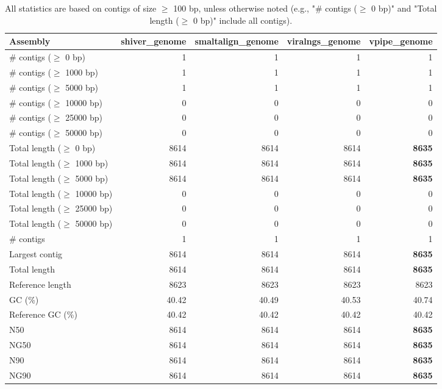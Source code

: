 \documentclass[12pt,a4paper]{article}
\begin{document}
\begin{table}[ht]
\begin{center}
\caption{All statistics are based on contigs of size $\geq$ 100 bp, unless otherwise noted (e.g., "\# contigs ($\geq$ 0 bp)" and "Total length ($\geq$ 0 bp)" include all contigs).}
\begin{tabular}{|l*{4}{|r}|}
\hline
Assembly & shiver\_genome & smaltalign\_genome & viralngs\_genome & vpipe\_genome \\ \hline
\# contigs ($\geq$ 0 bp) & 1 & 1 & 1 & 1 \\ \hline
\# contigs ($\geq$ 1000 bp) & 1 & 1 & 1 & 1 \\ \hline
\# contigs ($\geq$ 5000 bp) & 1 & 1 & 1 & 1 \\ \hline
\# contigs ($\geq$ 10000 bp) & 0 & 0 & 0 & 0 \\ \hline
\# contigs ($\geq$ 25000 bp) & 0 & 0 & 0 & 0 \\ \hline
\# contigs ($\geq$ 50000 bp) & 0 & 0 & 0 & 0 \\ \hline
Total length ($\geq$ 0 bp) & 8614 & 8614 & 8614 & {\bf 8635} \\ \hline
Total length ($\geq$ 1000 bp) & 8614 & 8614 & 8614 & {\bf 8635} \\ \hline
Total length ($\geq$ 5000 bp) & 8614 & 8614 & 8614 & {\bf 8635} \\ \hline
Total length ($\geq$ 10000 bp) & 0 & 0 & 0 & 0 \\ \hline
Total length ($\geq$ 25000 bp) & 0 & 0 & 0 & 0 \\ \hline
Total length ($\geq$ 50000 bp) & 0 & 0 & 0 & 0 \\ \hline
\# contigs & 1 & 1 & 1 & 1 \\ \hline
Largest contig & 8614 & 8614 & 8614 & {\bf 8635} \\ \hline
Total length & 8614 & 8614 & 8614 & {\bf 8635} \\ \hline
Reference length & 8623 & 8623 & 8623 & 8623 \\ \hline
GC (\%) & 40.42 & 40.49 & 40.53 & 40.74 \\ \hline
Reference GC (\%) & 40.42 & 40.42 & 40.42 & 40.42 \\ \hline
N50 & 8614 & 8614 & 8614 & {\bf 8635} \\ \hline
NG50 & 8614 & 8614 & 8614 & {\bf 8635} \\ \hline
N90 & 8614 & 8614 & 8614 & {\bf 8635} \\ \hline
NG90 & 8614 & 8614 & 8614 & {\bf 8635} \\ \hline

\end{tabular}
\end{center}
\end{table}
\end{document}
